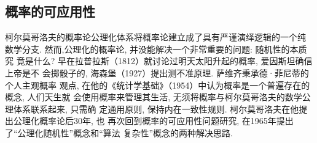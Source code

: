 \subsection{概率的可应用性}

柯尔莫哥洛夫的概率论公理化体系将概率论建立成了具有严谨演绎逻辑的一个纯
数学分支. 然而,公理化的概率论, 并没能解决一个非常重要的问题: 随机性的本质究
竟是什么? 早在拉普拉斯（1812）就讨论过明天太阳升起的概率, 爱因斯坦确信上帝是不
会掷骰子的, 海森堡（1927）提出测不准原理. 萨维齐秉承德·菲尼蒂的个人主观概率
观点, 在他的《统计学基础》（1954）中认为概率是一个普遍存在的概念, 人们天生就
会使用概率来管理其生活, 无须将概率与柯尔莫哥洛夫的数学公理体系联系起来, 只需确
定通用原则, 保持内在一致性规则. 柯尔莫哥洛夫在他提出公理化概率论后30年, 也
再次回到概率的可应用性问题研究, 在1965年提出了“公理化随机性”概念和“算法
复杂性”概念的两种解决思路.